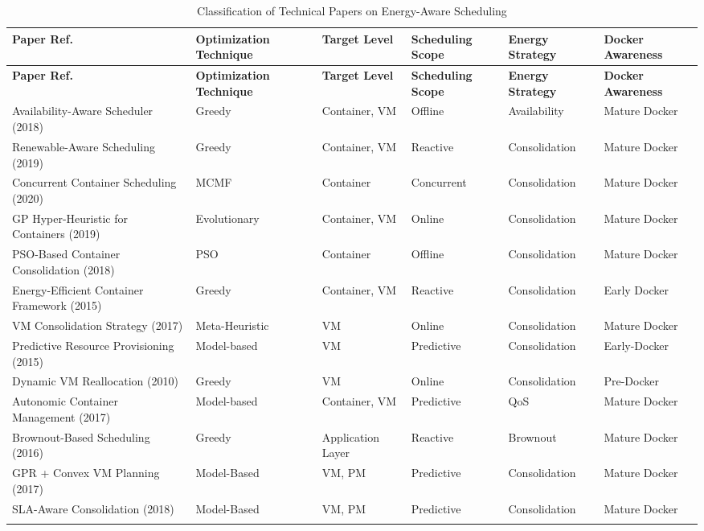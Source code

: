 \documentclass[runningheads]{llncs}
\begin{document}
\begin{footnotesize}
\begin{longtable}{|p{3.8cm}|p{2.3cm}|p{1.6cm}|p{2.3cm}|p{2.2cm}|p{2cm}|}
\hline
\textbf{Paper Ref.} & \textbf{Optimization Technique} & \textbf{Target Level} & \textbf{Scheduling Scope} & \textbf{Energy Strategy} & \textbf{Docker Awareness} \\
\hline
\endfirsthead

\hline
\textbf{Paper Ref.} & \textbf{Optimization Technique} & \textbf{Target Level} & \textbf{Scheduling Scope} & \textbf{Energy Strategy} & \textbf{Docker Awareness} \\
\hline
\endhead
Availability-Aware Scheduler\cite{alahmad_availability-aware_2018} (2018) & Greedy & Container, VM & Offline & Availability & Mature Docker\\
\hline
Renewable-Aware Scheduling\cite{kumar_renewable_2019} (2019)& Greedy & Container, VM & Reactive & Consolidation & Mature Docker \\
\hline
Concurrent Container Scheduling\cite{hu_concurrent_2020} (2020)& MCMF & Container & Concurrent & Consolidation & Mature Docker \\
\hline
GP Hyper-Heuristic for Containers\cite{tan_hybrid_2019} (2019)& Evolutionary & Container, VM & Online & Consolidation & Mature Docker \\
\hline
PSO-Based Container Consolidation\cite{shi_energy-aware_2018} (2018)& PSO & Container & Offline & Consolidation & Mature Docker \\
\hline
Energy-Efficient Container Framework\cite{piraghaj_framework_2015} (2015)& Greedy & Container, VM & Reactive & Consolidation & Early Docker \\
\hline
VM Consolidation Strategy\cite{carrega_energy-aware_2017} (2017)& Meta-Heuristic & VM & Online & Consolidation & Mature Docker \\
\hline
Predictive Resource Provisioning\cite{dabbagh_energy-efficient_2015} (2015)& Model-based  & VM & Predictive & Consolidation & Early-Docker \\
\hline
Dynamic VM Reallocation\cite{beloglazov_energy_2010} (2010) & Greedy & VM & Online & Consolidation & Pre-Docker \\
\hline
Autonomic Container Management\cite{barna_delivering_2017} (2017) & Model-based & Container, VM & Predictive & QoS & Mature Docker \\
\hline
Brownout-Based Scheduling\cite{xu_energy_2016} (2016)& Greedy & Application Layer & Reactive & Brownout & Mature Docker \\
\hline
GPR + Convex VM Planning\cite{bui_energy_2017} (2017) & Model-Based & VM, PM & Predictive & Consolidation & Mature Docker \\
\hline
SLA-Aware Consolidation\cite{li_sla-aware_2018} (2018) & Model-Based & VM, PM & Predictive & Consolidation & Mature Docker \\
\hline
\caption{Classification of Technical Papers on Energy-Aware Scheduling}
\label{tab:technical_papers}
\end{longtable}
\end{footnotesize}
\end{document}
